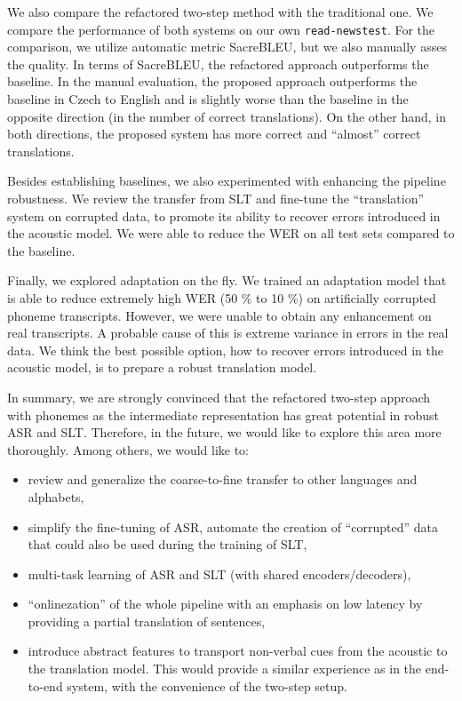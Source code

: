 We also compare the refactored two-step method with the traditional one. We compare the performance of both systems on our own \texttt{read-newstest}. For the comparison, we utilize automatic metric SacreBLEU, but we also manually asses the quality. In terms of SacreBLEU, the refactored approach outperforms the baseline. In the manual evaluation, the proposed approach outperforms the baseline in Czech to English and is slightly worse than the baseline in the opposite direction (in the number of correct translations). On the other hand, in both directions, the proposed system has more correct and ``almost'' correct translations.

Besides establishing baselines, we also experimented with enhancing the pipeline robustness. We review the transfer from SLT and fine-tune the ``translation'' system on corrupted data, to promote its ability to recover errors introduced in the acoustic model. We were able to reduce the WER on all test sets compared to the baseline.

Finally, we explored adaptation on the fly. We trained an adaptation model that is able to reduce extremely high WER (50 \% to 10 \%) on artificially corrupted phoneme transcripts. However, we were unable to obtain any enhancement on real transcripts. A probable cause of this is extreme variance in errors in the real data. We think the best possible option, how to recover errors introduced in the acoustic model, is to prepare a robust translation model. 

In summary, we are strongly convinced that the refactored two-step approach with phonemes as the intermediate representation has great potential in robust ASR and SLT. Therefore, in the future, we would like to explore this area more thoroughly. Among others, we would like to:

\begin{itemize}
	\item review and generalize the coarse-to-fine transfer to other languages and alphabets,
	\item simplify the fine-tuning of ASR, automate the creation of ``corrupted'' data that could also be used during the training of SLT,
	\item multi-task learning of ASR and SLT (with shared encoders/decoders),
	\item ``onlinezation'' of the whole pipeline with an emphasis on low latency by providing a partial translation of sentences,
	\item introduce abstract features to transport non-verbal cues from the acoustic to the translation model. This would provide a similar experience as in the end-to-end system, with the convenience of the two-step setup.
\end{itemize}